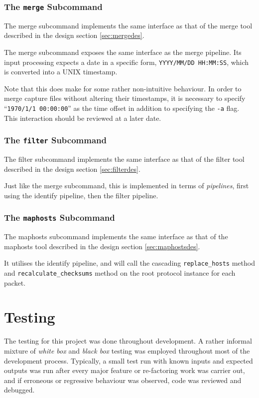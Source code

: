 \documentclass[10pt,a4paper,notitlepage]{report}
\begin{document}
\subsection{The \texttt{merge} Subcommand}
The merge subcommand implements the same interface as that of the merge tool described in the design section \ref{sec:mergedes}.

The merge subcommand exposes the same interface as the merge pipeline. Its input processing expects a date in a specific form, \texttt{YYYY/MM/DD HH:MM:SS}, which is converted into a UNIX timestamp.

Note that this does make for some rather non-intuitive behaviour. In order to merge capture files without altering their timestamps, it is necessary to specify ``\texttt{1970/1/1 00:00:00}'' as the time offset in addition to specifying the \texttt{-a} flag. This interaction should be reviewed at a later date.

\subsection{The \texttt{filter} Subcommand}
The filter subcommand implements the same interface as that of the filter tool described in the design section \ref{sec:filterdes}.

Just like the merge subcommand, this is implemented in terms of \emph{pipelines}, first using the identify pipeline, then the filter pipeline.

\subsection{The \texttt{maphosts} Subcommand}
The maphosts subcommand implements the same interface as that of the maphosts tool described in the design section \ref{sec:maphostsdes}.

It utilises the identify pipeline, and will call the cascading \texttt{replace_hosts} method and \texttt{recalculate_checksums} method on the root protocol instance for each packet.

\chapter{Testing}
The testing for this project was done throughout development. 
A rather informal mixture of \emph{white box} and \emph{black box} testing was employed throughout most of the development process. Typically, a small test run with known inputs and expected outputs was run after every major feature or re-factoring work was carrier out, and if erroneous or regressive behaviour was observed, code was reviewed and debugged.
\end{document}
